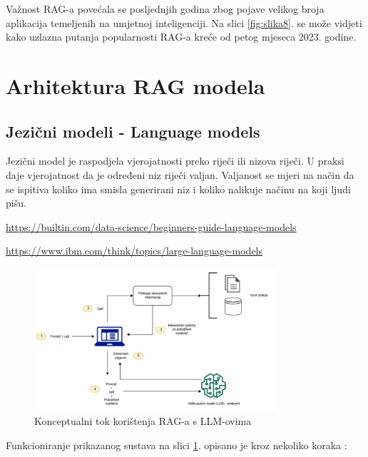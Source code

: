 \documentclass[]{foi}
\begin{document}
Važnost RAG-a povećala se posljednjih godina zbog pojave velikog broja aplikacija temeljenih na umjetnoj inteligenciji. Na slici \ref{fig:slika8}. se može vidjeti kako uzlazna putanja popularnosti RAG-a kreće od petog mjeseca 2023. godine.


\section{Arhitektura RAG modela}
\subsection{Jezični modeli - Language models}

Jezični model je raspodjela vjerojatnosti preko riječi ili nizova riječi. U praksi daje vjerojatnost da je određeni niz riječi valjan. Valjanost se mjeri na način da se ispitiva koliko
ima smisla generirani niz i koliko nalikuje načinu na koji ljudi pišu.

\url{https://builtin.com/data-science/beginners-guide-language-models}

\url{https://www.ibm.com/think/topics/large-language-models}


\begin{figure}[ht!]
    \centering
    \includegraphics[width=0.8\textwidth]{./assets/arhitektura.png} 
    \caption{Konceptualni tok korištenja RAG-a s LLM-ovima \cite{awsRAG2025}}
    \label{fig:slika1}
\end{figure}

Funkcioniranje prikazanog sustava na slici \ref{fig:slika1}. opisano je kroz nekoliko  koraka \cite{awsRAG2025}:
\end{document}
